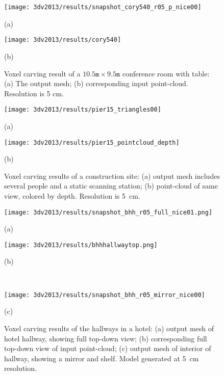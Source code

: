 \documentclass[12pt,onecolumn,oneside]{book}
\begin{document}
\begin{figure}
	\begin{minipage}[b]{0.48\linewidth}
	\centerline{\texttt{[image: 3dv2013/results/snapshot\_cory540\_r05\_p\_nice00]}}
	\centerline{(a)}\medskip
	\end{minipage}
	\hfill
	\begin{minipage}[b]{0.48\linewidth}
	\centerline{\texttt{[image: 3dv2013/results/cory540]}}
	\centerline{(b)}\medskip
	\end{minipage}
	\caption[Voxel carving result of conference room.]{Voxel carving result of a $10.5 \texttt{m} \times 9.5 \texttt{m}$ conference room with table: (a) The output mesh; (b) corresponding input point-cloud.  Resolution is 5 cm.}
	\label{fig:3dv2013_cory540}
\end{figure}

\begin{figure}

	\centering
	\begin{minipage}[b]{0.98\linewidth}
	\centerline{\texttt{[image: 3dv2013/results/pier15\_triangles00]}}
	\centerline{(a)}
	\end{minipage}
	\begin{minipage}[b]{0.98\linewidth}
	\centerline{\texttt{[image: 3dv2013/results/pier15\_pointcloud\_depth]}}
	\centerline{(b)}\medskip
	\end{minipage}

	\caption[Voxel carving results of a construction area.]{Voxel carving results of a construction site:  (a) output mesh includes several people and a static scanning station; (b) point-cloud of same view, colored by depth.  Resolution is 5~cm.}
	\label{fig:3dv2013_pier15}
\end{figure}

\begin{figure}[t]

	\centering
	\begin{minipage}[b]{0.45\linewidth}
	\centerline{\texttt{[image: 3dv2013/results/snapshot\_bhh\_r05\_full\_nice01.png]}}
	\centerline{(a)}
	\end{minipage}
	\hfill
	\begin{minipage}[b]{0.45\linewidth}
	\centerline{\texttt{[image: 3dv2013/results/bhhhallwaytop.png]}}
	\centerline{(b)}
	\end{minipage}
	\\
	\begin{minipage}[b]{0.75\linewidth}
	\centerline{\texttt{[image: 3dv2013/results/snapshot\_bhh\_r05\_mirror\_nice00]}}
	\centerline{(c)}
	\end{minipage}

	\caption[Voxel carving results of hotel hallways.]{Voxel carving results of the hallways in a hotel: (a) output mesh of hotel hallway, showing full top-down view; (b) corresponding full top-down view of input point-cloud; (c) output mesh of interior of hallway, showing a mirror and shelf.  Model generated at 5~cm resolution.}
	\label{fig:3dv2013_bhh_hallway}
\end{figure}
\end{document}
